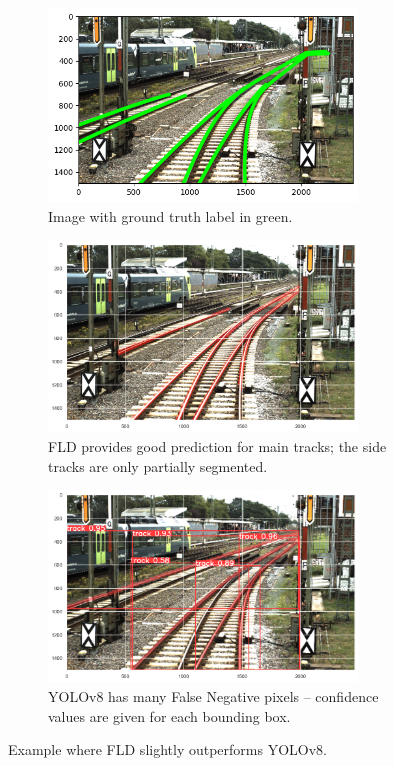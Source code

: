 \documentclass[Master,MDS,english]{BASE/twbook} %
\begin{document}
\begin{figure}[H]
\centering
\begin{subfigure}[t]{.33\textwidth}
  \centering
  \includegraphics[width=0.9\textwidth]{images/results/example2_gt}
  \caption{Image with ground truth label in green.}
\end{subfigure}
\begin{subfigure}[t]{.33\textwidth}
  \centering
  \includegraphics[width=0.9\textwidth]{images/results/example2}
  \caption{FLD provides good prediction for main tracks; the side tracks are only partially segmented.}
\end{subfigure}%
\begin{subfigure}[t]{.33\textwidth}
  \centering
  \includegraphics[width=0.9\textwidth]{images/results/example3}
  \caption{YOLOv8 has many False Negative pixels -- confidence values are given for each bounding box. }
\end{subfigure}
\caption{Example where FLD slightly outperforms YOLOv8.}
\label{fig:res_example2}
\end{figure}
\end{document}
